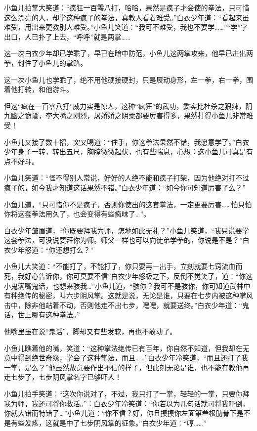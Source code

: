 \documentclass[12pt,oneside]{book}
\begin{document}
小鱼儿拍掌大笑道：``疯狂一百零八打，哈哈，果然是疯子才会使的拳法，只可惜这么漂亮的人，却学这种疯子的拳法，真教人看着难受。''白衣少年道：``看起来虽难受，用出来更教别人难受。''小鱼儿笑道：``我可不难受，我也不要学\ldots\ldots{}''``学''字出口，人已扑了上去，``呼呼''就是两掌\ldots\ldots{}

这一次白衣少年却已学乖了，早已在暗中防范，小鱼儿这两掌攻来，他早已击出两拳，封住了小鱼儿的掌路。

这一次小鱼儿也学乖了，绝不用他硬接硬封，只是展动身形，左一拳，右一拳，围着他打转，和他游斗。

但这``疯在一百零八打''威力实是惊人，这种``疯狂''的武功，委实比杜杀之狠辣，阴九幽之诡谲，李大嘴之刚烈，屠娇娇之阴柔都要厉害得多，果然打得小鱼儿非常难受！

小鱼儿又接了数十招，突又喝道：``住手，你这拳法果然不错，我愿意学了。''白衣少年身子一转，转出五尺，胸膛微微起伏，也有些喘息，心想：这小鱼儿可真是有点不好斗。

小鱼儿笑道：``怪不得别人常说，好好的人绝不能和疯子打架，因为他绝对打不过疯子的，如今我才知道这话果然不错。''白衣少年道：``如今你可知道厉害了么？''

小鱼儿道，``只可惜你不是疯子，否则你使出的这套拳法，一定更要厉害\ldots\ldots 怕只怕你将这套拳法用久了，也会变得有些疯味了\ldots{}''。

白衣少年皱眉道，``你既要拜我为师，怎地如此无礼？''小鱼儿笑道，``我只说要学这套拳法，可没说要拜你为师。师父一样也可以向徒弟学拳的，你说是不是？''白衣少年怒道：``你还想打么？''

小鱼儿大笑道：``不能打了，不能打了，你只要再一出手，立刻就要七窍流血而死，我好心告诉你，你可莫要不信''白衣少年怒极之下，反倒不觉笑了，道：``你这小鬼满嘴鬼话，也想来骇我\ldots{}''小鱼儿道，``骇你？我可不是骇你，你可知道武林中有种绝传的秘密，叫六步阴风掌。这就是说，无论是谁，只要在七步内被这种掌风击中，除非他站着不动，否则他走不出七步，嘿嘿，就要送终。''白衣少年道：``鬼话，世上哪有这种拳法。''

他嘴里虽在说``鬼话''，脚却又有些发软，再也不敢动了。

小鱼儿瞧着他的嘴，笑道：``这种掌法绝传已有百年，你自然不知道，但我却在无意中得到绝世奇缘，学会了这种掌法，而且\ldots\ldots{}''白衣少年冷笑道，``而且还打了我一掌，是么？''他虽然故意要作出不信的样子，但此刻无论是谁，也不能在教他再走七步了，七步阴风掌名字已够吓人！

小鱼儿拍手笑道：``这次你说对了，不过，我只打了一掌，轻轻的一掌，只要你拜我为师，我还可将你救活。''：白衣少年冷笑道：``你若以为几句话就可将我吓倒，你就大错而特错了\ldots{}''小鱼儿道：``你不信？好，你且摸摸你左面第叁根肋骨下是不是有些发疼，这就是中了七步阴风掌的征象。''白衣少年道：``哼\ldots\ldots{}''
\end{document}
